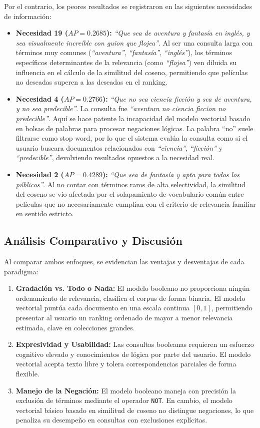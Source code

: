 \documentclass[conference,a4paper]{IEEEtran}
\begin{document}
Por el contrario, los peores resultados se registraron en las siguientes necesidades de información:
\begin{itemize}
    \item \textbf{Necesidad 19 ($AP = 0.2685$):} \textit{``Que sea de aventura y fantasía en inglés, y sea visualmente increíble con guion que flojea''}. Al ser una consulta larga con términos muy comunes (\textit{``aventura''}, \textit{``fantasía''}, \textit{``inglés''}), los términos específicos determinantes de la relevancia (como \textit{``flojea''}) ven diluida su influencia en el cálculo de la similitud del coseno, permitiendo que películas no deseadas superen a las deseadas en el ranking.
    \item \textbf{Necesidad 4 ($AP = 0.2766$):} \textit{``Que no sea ciencia ficción y sea de aventura, y no sea predecible''}. La consulta fue \textit{``aventura no ciencia ficcion no predecible''}. Aquí se hace patente la incapacidad del modelo vectorial basado en bolsas de palabras para procesar negaciones lógicas. La palabra ``no'' suele filtrarse como stop word, por lo que el sistema evalúa la consulta como si el usuario buscara documentos relacionados con \textit{``ciencia''}, \textit{``ficción''} y \textit{``predecible''}, devolviendo resultados opuestos a la necesidad real.
    \item \textbf{Necesidad 2 ($AP = 0.4289$):} \textit{``Que sea de fantasía y apta para todos los públicos''}. Al no contar con términos raros de alta selectividad, la similitud del coseno se vio afectada por el solapamiento de vocabulario común entre películas que no necesariamente cumplían con el criterio de relevancia familiar en sentido estricto.
\end{itemize}

\subsection{Análisis Comparativo y Discusión}

Al comparar ambos enfoques, se evidencian las ventajas y desventajas de cada paradigma:
\begin{enumerate}
    \item \textbf{Gradación vs. Todo o Nada:} El modelo booleano no proporciona ningún ordenamiento de relevancia, clasifica el corpus de forma binaria. El modelo vectorial puntúa cada documento en una escala continua $[0, 1]$, permitiendo presentar al usuario un ranking ordenado de mayor a menor relevancia estimada, clave en colecciones grandes.
    \item \textbf{Expresividad y Usabilidad:} Las consultas booleanas requieren un esfuerzo cognitivo elevado y conocimientos de lógica por parte del usuario. El modelo vectorial acepta texto libre y tolera correspondencias parciales de forma flexible.
    \item \textbf{Manejo de la Negación:} El modelo booleano maneja con precisión la exclusión de términos mediante el operador \texttt{NOT}. En cambio, el modelo vectorial básico basado en similitud de coseno no distingue negaciones, lo que penaliza su desempeño en consultas con exclusiones explícitas.
\end{enumerate}
\end{document}
